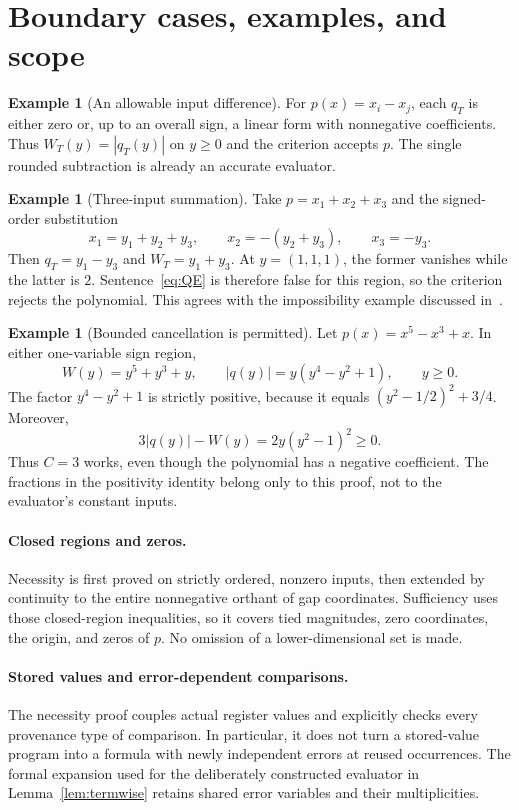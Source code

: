 \documentclass[11pt,a4paper]{article}
\numberwithin{equation}{section}
\theoremstyle{definition}
\newtheorem{example}[theorem]{Example}
\theoremstyle{remark}
\newcommand{\abs}[1]{\left|#1\right|}
\begin{document}
\section{Boundary cases, examples, and scope}\label{sec:scope}
\begin{example}[An allowable input difference]
For $p(x)=x_i-x_j$, each $q_T$ is either zero or, up to an overall sign,
a linear form with nonnegative coefficients.  Thus
$W_T(y)=\abs{q_T(y)}$ on $y\ge0$ and the criterion accepts $p$.
The single rounded subtraction is already an accurate evaluator.
\end{example}

\begin{example}[Three-input summation]
Take $p=x_1+x_2+x_3$ and the signed-order substitution
\[
 x_1=y_1+y_2+y_3,\qquad
 x_2=-(y_2+y_3),\qquad x_3=-y_3.
\]
Then $q_T=y_1-y_3$ and $W_T=y_1+y_3$.  At $y=(1,1,1)$, the former
vanishes while the latter is $2$.  Sentence~\eqref{eq:QE} is therefore
false for this region, so the criterion rejects the polynomial.  This
agrees with the impossibility example discussed in~\cite{DDH06,DDHK08}.
\end{example}

\begin{example}[Bounded cancellation is permitted]
Let $p(x)=x^5-x^3+x$.  In either one-variable sign region,
\[
 W(y)=y^5+y^3+y,\qquad
 \abs{q(y)}=y(y^4-y^2+1),\qquad y\ge0.
\]
The factor $y^4-y^2+1$ is strictly positive, because it equals
$(y^2-1/2)^2+3/4$.  Moreover,
\[
 3\abs{q(y)}-W(y)=2y(y^2-1)^2\ge0.
\]
Thus $C=3$ works, even though the polynomial has a negative coefficient.
The fractions in the positivity identity belong only to this proof, not
to the evaluator's constant inputs.
\end{example}

\paragraph{Closed regions and zeros.}
Necessity is first proved on strictly ordered, nonzero inputs, then
extended by continuity to the entire nonnegative orthant of gap
coordinates.  Sufficiency uses those closed-region inequalities, so it
covers tied magnitudes, zero coordinates, the origin, and zeros of $p$.
No omission of a lower-dimensional set is made.

\paragraph{Stored values and error-dependent comparisons.}
The necessity proof couples actual register values and explicitly checks
every provenance type of comparison.  In particular, it does not turn a
stored-value program into a formula with newly independent errors at
reused occurrences.  The formal expansion used for the deliberately
constructed evaluator in Lemma~\ref{lem:termwise} retains shared error
variables and their multiplicities.
\end{document}
